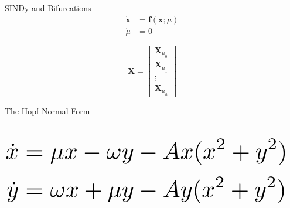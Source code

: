 \documentclass[aspectratio=169]{beamer}
\begin{document}
\begin{frame}{SINDy and Bifurcations}
	\begin{equation*}
		\begin{split}
			\mathbf {\dot x} &=  \mathbf{f}(\mathbf x; \mu) \\
			\dot \mu &= 0
		\end{split}
	\end{equation*}

	\vspace{1.5em}

	\[ \mathbf X = \begin{bmatrix}
		\mathbf X_{\mu_0} \\ \mathbf X_{\mu_1} \\ \vdots \\ \mathbf X_{\mu_h}
	\end{bmatrix} \]
\end{frame}

\begin{frame}{The Hopf Normal Form}
	\begin{columns}
		\begin{equation*}
			\resizebox{\textwidth}{!}{$
			\begin{aligned}
				\dot x &= \mu x - \omega y - Ax(x^2 + y^2) \\
			\dot y &= \omega x +\mu y - Ay(x^2 + y^2)
			\end{aligned}
			$}
		\end{equation*}
		\begin{center}
			\includegraphics[width=0.85\textwidth, trim = {4cm, 2cm, 4cm, 2.5cm}, clip]{hopf_normal_actual.pdf}
		\end{center}
	\end{columns}
\end{frame}
\end{document}
